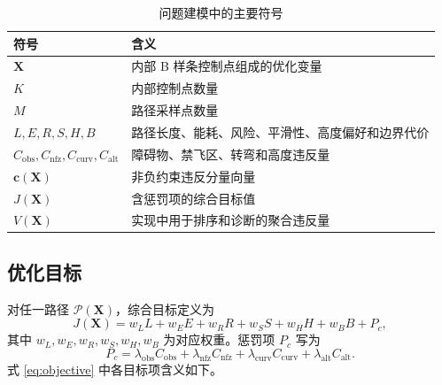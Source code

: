 \begin{table}[tbp]
\centering
\caption{问题建模中的主要符号}
\label{tab:problem-notation}
\begin{tabularx}{\linewidth}{@{}lX@{}}
\toprule
符号 & 含义 \\
\midrule
$\mathbf{X}$ & 内部 B 样条控制点组成的优化变量 \\
$K$ & 内部控制点数量 \\
$M$ & 路径采样点数量 \\
$L,E,R,S,H,B$ & 路径长度、能耗、风险、平滑性、高度偏好和边界代价 \\
$C_{\mathrm{obs}},C_{\mathrm{nfz}},C_{\mathrm{curv}},C_{\mathrm{alt}}$ & 障碍物、禁飞区、转弯和高度违反量 \\
$\mathbf c(\mathbf X)$ & 非负约束违反分量向量 \\
$J(\mathbf{X})$ & 含惩罚项的综合目标值 \\
$V(\mathbf{X})$ & 实现中用于排序和诊断的聚合违反量 \\
\bottomrule
\end{tabularx}
\end{table}

\subsection{优化目标}

对任一路径 $\mathcal{P}(\mathbf{X})$，综合目标定义为
\begin{equation}
    J(\mathbf{X}) =
    w_L L + w_E E + w_R R + w_S S + w_H H + w_B B + P_c ,
    \label{eq:objective}
\end{equation}
其中 $w_L,w_E,w_R,w_S,w_H,w_B$ 为对应权重。惩罚项 $P_c$ 写为
\begin{equation}
    P_c =
    \lambda_{\mathrm{obs}} C_{\mathrm{obs}}
    + \lambda_{\mathrm{nfz}} C_{\mathrm{nfz}}
    + \lambda_{\mathrm{curv}} C_{\mathrm{curv}}
    + \lambda_{\mathrm{alt}} C_{\mathrm{alt}} .
    \label{eq:penalty}
\end{equation}
式 \eqref{eq:objective} 中各目标项含义如下。


